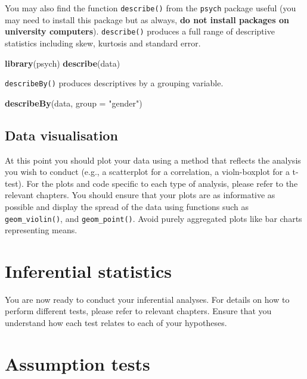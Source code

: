 \documentclass[]{book}
\newenvironment{Shaded}{\begin{snugshade}}{\end{snugshade}}
\newcommand{\DataTypeTok}[1]{\textcolor[rgb]{0.13,0.29,0.53}{#1}}
\newcommand{\KeywordTok}[1]{\textcolor[rgb]{0.13,0.29,0.53}{\textbf{#1}}}
\newcommand{\NormalTok}[1]{#1}
\newcommand{\StringTok}[1]{\textcolor[rgb]{0.31,0.60,0.02}{#1}}
\begin{document}
You may also find the function \texttt{describe()} from the \texttt{psych} package useful (you may need to install this package but as always, \textbf{do not install packages on university computers}). \texttt{describe()} produces a full range of descriptive statistics including skew, kurtosis and standard error.

\begin{Shaded}
\begin{Highlighting}[]
\KeywordTok{library}\NormalTok{(psych)}
\KeywordTok{describe}\NormalTok{(data)}
\end{Highlighting}
\end{Shaded}

\texttt{describeBy()} produces descriptives by a grouping variable.

\begin{Shaded}
\begin{Highlighting}[]
\KeywordTok{describeBy}\NormalTok{(data, }\DataTypeTok{group =} \StringTok{"gender"}\NormalTok{)}
\end{Highlighting}
\end{Shaded}

\hypertarget{data-visualisation}{%
\subsection{Data visualisation}\label{data-visualisation}}

At this point you should plot your data using a method that reflects the analysis you wish to conduct (e.g., a scatterplot for a correlation, a violn-boxplot for a t-test). For the plots and code specific to each type of analysis, please refer to the relevant chapters. You should ensure that your plots are as informative as possible and display the spread of the data using functions such as \texttt{geom\_violin()}, and \texttt{geom\_point()}. Avoid purely aggregated plots like bar charts representing means.

\hypertarget{inferential-statistics}{%
\section{Inferential statistics}\label{inferential-statistics}}

You are now ready to conduct your inferential analyses. For details on how to perform different tests, please refer to relevant chapters. Ensure that you understand how each test relates to each of your hypotheses.

\hypertarget{assumption-tests}{%
\section{Assumption tests}\label{assumption-tests}}
\end{document}
